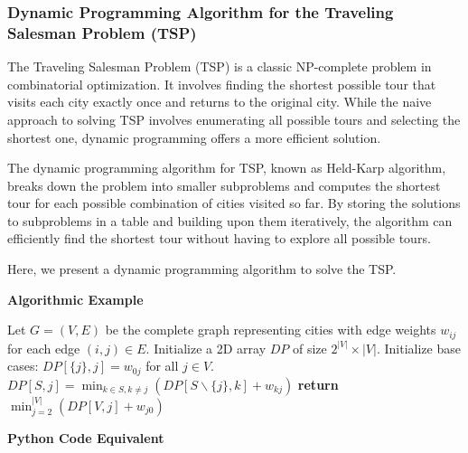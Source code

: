 \documentclass[12pt]{book} %
\begin{document}
\subsubsection{Dynamic Programming Algorithm for the Traveling Salesman Problem (TSP)}

The Traveling Salesman Problem (TSP) is a classic NP-complete problem in combinatorial optimization. It involves finding the shortest possible tour that visits each city exactly once and returns to the original city. While the naive approach to solving TSP involves enumerating all possible tours and selecting the shortest one, dynamic programming offers a more efficient solution.

The dynamic programming algorithm for TSP, known as Held-Karp algorithm, breaks down the problem into smaller subproblems and computes the shortest tour for each possible combination of cities visited so far. By storing the solutions to subproblems in a table and building upon them iteratively, the algorithm can efficiently find the shortest tour without having to explore all possible tours.

Here, we present a dynamic programming algorithm to solve the TSP.

\textbf{Algorithmic Example}
\FloatBarrier
\begin{algorithm}
\caption{Dynamic Programming for TSP}
\begin{algorithmic}[1]
\State Let $G=(V,E)$ be the complete graph representing cities with edge weights $w_{ij}$ for each edge $(i,j) \in E$.
\State Initialize a 2D array $DP$ of size $2^{|V|} \times |V|$.
\State Initialize base cases: $DP[\{j\},j] = w_{0j}$ for all $j \in V$.
            \State $DP[S, j] = \min_{k \in S, k \neq j}(DP[S \backslash \{j\}, k] + w_{kj})$
        \EndFor
    \EndFor
\EndFor
\State \textbf{return} $\min_{j=2}^{|V|}(DP[V, j] + w_{j0})$
\end{algorithmic}
\end{algorithm}
\FloatBarrier
\textbf{Python Code Equivalent}
\end{document}
